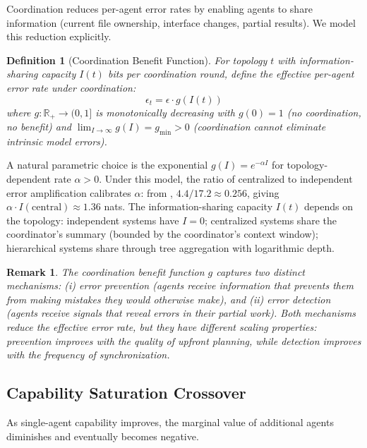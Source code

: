\documentclass[11pt, a4paper, logo, copyright]{googledeepmind}
\newtheorem{definition}{Definition}[section]
\newtheorem*{remark}{Remark}
\begin{document}
Coordination reduces per-agent error rates by enabling agents to share information (current file ownership, interface changes, partial results). We model this reduction explicitly.

\begin{definition}[Coordination Benefit Function]
\label{def:coord-benefit}
For topology $t$ with information-sharing capacity $I(t)$ bits per coordination round, define the effective per-agent error rate under coordination:
\begin{equation}
    \epsilon_t = \epsilon \cdot g(I(t))
\end{equation}
where $g: \mathbb{R}_+ \to (0, 1]$ is monotonically decreasing with $g(0) = 1$ (no coordination, no benefit) and $\lim_{I \to \infty} g(I) = g_{\min} > 0$ (coordination cannot eliminate intrinsic model errors).
\end{definition}

A natural parametric choice is the exponential $g(I) = e^{-\alpha I}$ for topology-dependent rate $\alpha > 0$. Under this model, the ratio of centralized to independent error amplification calibrates $\alpha$: from \citet{kim2025scaling}, $4.4/17.2 \approx 0.256$, giving $\alpha \cdot I(\mathrm{central}) \approx 1.36$ nats. The information-sharing capacity $I(t)$ depends on the topology: independent systems have $I = 0$; centralized systems share the coordinator's summary (bounded by the coordinator's context window); hierarchical systems share through tree aggregation with logarithmic depth.

\begin{remark}
The coordination benefit function $g$ captures two distinct mechanisms: (i) error prevention (agents receive information that prevents them from making mistakes they would otherwise make), and (ii) error detection (agents receive signals that reveal errors in their partial work). Both mechanisms reduce the effective error rate, but they have different scaling properties: prevention improves with the quality of upfront planning, while detection improves with the frequency of synchronization.
\end{remark}

\subsection{Capability Saturation Crossover}

As single-agent capability improves, the marginal value of additional agents diminishes and eventually becomes negative.
\end{document}

